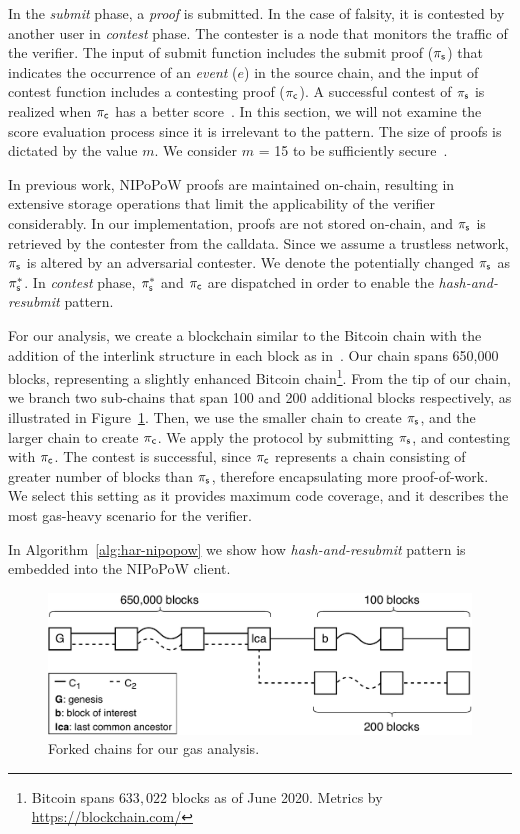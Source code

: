In the \emph{submit} phase, a \emph{proof} is submitted. In the case of falsity, it
is contested by another user in \emph{contest} phase. The contester is a node
that monitors the traffic of the verifier. The input of \textsf{submit}
function includes the submit proof ($\mathsf{\pi_{s}}$) that indicates the occurrence of an
\emph{event} ($e$) in the source chain, and the input of \textsf{contest}
function includes a contesting proof ($\mathsf{\pi_{c}}$). A successful contest of $\mathsf{\pi_{s}}$
is realized when $\mathsf{\pi_{c}}$ has a better score~\cite{nipopows}. In this section, we
will not examine the score evaluation process since it is irrelevant to the
pattern. The size of proofs is dictated by the value $m$. We consider $m$ = 15
to be sufficiently secure~\cite{nipopows}.

In previous work, NIPoPoW proofs are maintained on-chain, resulting in
extensive storage operations that limit the applicability of the verifier
considerably. In our implementation, proofs are not stored on-chain, and $\mathsf{\pi_{s}}$
is retrieved by the contester from the calldata. Since we
assume a trustless network, $\mathsf{\pi_{s}}$ is altered by an adversarial contester. We denote
the potentially changed $\mathsf{\pi_{s}}$ as $\mathsf{\pi_{s}^*}$. In \emph{contest} phase, $\mathsf{\pi_{s}^*}$ and
$\mathsf{\pi_{c}}$ are dispatched in order to enable the \emph{hash-and-resubmit} pattern.

For our analysis, we create a blockchain similar to the Bitcoin chain with the
addition of the interlink structure in each block as in~\cite{gglou}. Our chain
spans 650,000 blocks, representing a slightly enhanced Bitcoin
chain\footnote{Bitcoin spans $633{,}022$ blocks as of June 2020. Metrics by
\url{https://blockchain.com/}}. From the tip of our chain, we branch two
sub-chains that span 100 and 200 additional blocks respectively, as illustrated
in Figure~\ref{fig:chains}. Then, we use the smaller chain to create $\mathsf{\pi_{s}}$,
and the larger chain to create $\mathsf{\pi_{c}}$. We apply the protocol by submitting
$\mathsf{\pi_{s}}$, and contesting with $\mathsf{\pi_{c}}$. The contest is successful, since $\mathsf{\pi_{c}}$
represents a chain consisting of greater number of blocks than $\mathsf{\pi_{s}}$,
therefore encapsulating more proof-of-work. We select this setting as it
provides maximum code coverage, and it describes the most gas-heavy scenario
for the verifier.

In Algorithm~\ref{alg:har-nipopow} we show how \emph{hash-and-resubmit} pattern
is embedded into the NIPoPoW client.

\begin{figure}[!h]
    \begin{center}
        \includegraphics[width=0.6\columnwidth]{figures/nipopow-subm-cont}
    \end{center}
    \caption{Forked chains for our gas analysis.}
    \label{fig:chains}
\end{figure}

